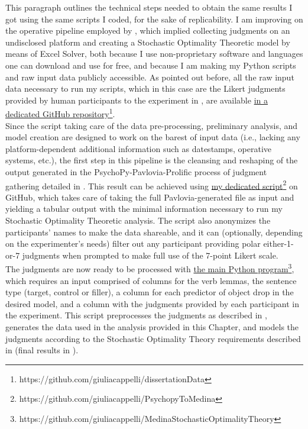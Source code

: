 This paragraph outlines the technical steps needed to obtain the same results I got using the same scripts I coded, for the sake of replicability. I am improving on the operative pipeline employed by \textcite{Medina2007}, which implied collecting judgments on an undisclosed platform and creating a Stochastic Optimality Theoretic model by means of Excel Solver, both because I use non-proprietary software and languages one can download and use for free, and because I am making my Python scripts and raw input data publicly accessible. As pointed out before, all the raw input data necessary to run my scripts, which in this case are the Likert judgments provided by human participants to the experiment in , are available \href{https://github.com/giuliacappelli/dissertationData}{in a dedicated GitHub repository}\footnote{https://github.com/giuliacappelli/dissertationData}.\\
Since the script taking care of the data pre-processing, preliminary analysis, and model creation are designed to work on the barest of input data (i.e., lacking any platform-dependent additional information such as datestamps, operative systems, etc.), the first step in this pipeline is the cleansing and reshaping of the output generated in the PsychoPy-Pavlovia-Prolific process of judgment gathering detailed in . This result can be achieved using \href{https://github.com/giuliacappelli/PsychopyToMedina}{my dedicated script}\footnote{https://github.com/giuliacappelli/PsychopyToMedina} on GitHub, which takes care of taking the full Pavlovia-generated file as input and yielding a tabular output with the minimal information necessary to run my Stochastic Optimality Theoretic analysis. The script also anonymizes the participants' names to make the data shareable, and it can (optionally, depending on the experimenter's needs) filter out any participant providing polar either-1-or-7 judgments when prompted to make full use of the 7-point Likert scale.\\
The judgments are now ready to be processed with \href{https://github.com/giuliacappelli/MedinaStochasticOptimalityTheory}{the main Python program}\footnote{https://github.com/giuliacappelli/MedinaStochasticOptimalityTheory}, which requires an input comprised of columns for the verb lemmas, the sentence type (target, control or filler), a column for each predictor of object drop in the desired model, and a column with the judgments provided by each participant in the experiment. This script preprocesses the judgments as described in , generates the data used in the analysis provided in this Chapter, and models the judgments according to the Stochastic Optimality Theory requirements described in  (final results in ).

